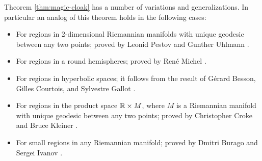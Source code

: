 Theorem \ref{thm:magic-cloak} has a number of variations and generalizations.
In particular an analog of this theorem holds in the following cases:
\begin{itemize}
\item For regions in 2-dimensional Riemannian manifolds with unique geodesic between any two points; proved by Leonid Pestov and Gunther Uhlmann \cite{pestov-uhlmann}.
\item For regions in a round  hemispheres; proved by Ren\'{e} Michel \cite{michel-1981}.
\item For regions in hyperbolic spaces; it follows from the result of Gérard Besson, Gilles Courtois, and Sylvestre Gallot \cite{besson-courtois-gallot-1995}.
\item For regions in the product space $\mathbb{R}\times M$, where $M$ is a Riemannian manifold with unique geodesic between any two points; proved by Christopher Croke and Bruce Kleiner \cite{croke-kleiner-1998}.
\item For small regions in any Riemannian manifold; proved by Dmitri Burago and Sergei Ivanov \cite{burago-ivanov-2010}.
\end{itemize}




